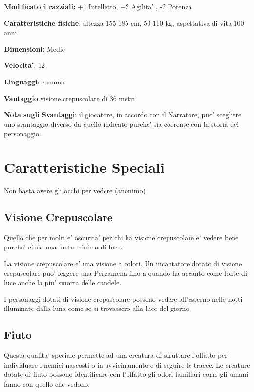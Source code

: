 \documentclass[a4paper,11pt,twoside,openany]{dndbook}
\begin{document}
\textbf{Modificatori razziali:} +1 Intelletto, +2 Agilita' , -2 Potenza

\textbf{Caratteristiche fisiche}: altezza 155-185 cm, 50-110 kg, aspettativa
di vita 100 anni

\textbf{Dimensioni:} Medie

\textbf{Velocita'}: 12

\textbf{Linguaggi}: comune

\textbf{Vantaggio} visione crepuscolare di 36 metri

\bigskip

\textbf{Nota sugli Svantaggi}: il giocatore, in accordo con il Narratore, puo' scegliere uno svantaggio diverso da quello indicato purche' sia coerente con la storia del personaggio.


\pagebreak

\section{Caratteristiche Speciali}

\label{caratteristiche-speciali}
\begin{quotebox}Non basta avere gli occhi per vedere (anonimo)
\end{quotebox}

\subsection{Visione Crepuscolare}

Quello che per molti e’ oscurita’ per chi ha visione crepuscolare e’ vedere bene purche’ ci sia una fonte minima di luce.

La visione crepuscolare e' una visione a colori.
Un incantatore dotato di visione crepuscolare puo' leggere una Pergamena fino a quando ha accanto come fonte di luce anche la piu' smorta delle candele.

I personaggi dotati di visione crepuscolare possono vedere all’esterno nelle notti illuminate dalla luna come se si trovassero alla luce del giorno.

\subsection{Fiuto}

Questa qualita’ speciale permette ad una creatura di sfruttare l'olfatto per individuare i nemici nascosti o in avvicinamento e di seguire le tracce. Le creature dotate di fiuto possono identificare con l'olfatto gli odori familiari come gli umani fanno con quello che vedono.
\end{document}
